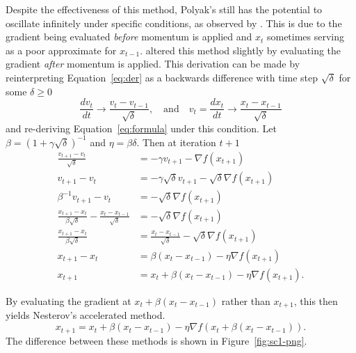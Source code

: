 \documentclass{article}
\newcommand{\dv}[2]{\frac{d #1}{d #2}}
\theoremstyle{definition}
\begin{document}
Despite the effectiveness of this method, Polyak's still has the potential to
oscillate infinitely under specific conditions, as observed by
\citeauthor{lessard2016analysis}. This is due to the gradient being evaluated
\emph{before} momentum is applied and $x_t$ sometimes serving as a poor approximate
for $x_{t - 1}$. \citeauthor{nesterov1983method} altered this method slightly by
evaluating the gradient \emph{after} momentum is applied.  This derivation can
be made by reinterpreting Equation~\ref{eq:der} as a backwards difference with time
step $\sqrt\delta$ for some $\delta \geq 0$
\begin{equation}
    \label{eq:der}
    \dv{v_t}{t} \rightarrow \frac{v_{t} - v_{t - 1}}{\sqrt{\delta}}, \quad \text{and}
    \quad v_{t} = \dv{x_t}{t} \rightarrow \frac{x_{t} - x_{t - 1}}{\sqrt{\delta}}
\end{equation}
and re-deriving Equation~\ref{eq:formula} under this condition. Let $\beta =
{\left( 1 + \gamma \sqrt{\delta} \right) }^{-1}$ and $\eta = \beta \delta$. Then
at iteration $t + 1$
\begin{equation}
    \label{eq:formula}
    \begin{aligned}
        \frac{v_{t + 1} - v_{t}}{\sqrt{\delta}} &= -\gamma v_{t + 1} -\nabla
        f(x_{t + 1}) \\
        v_{t + 1} - v_{t} &= -\gamma \sqrt{\delta}v_{t + 1} -\sqrt{\delta}\nabla
        f(x_{t + 1}) \\
        \beta^{-1}v_{t + 1} - v_{t} &= -\sqrt{\delta}\nabla
        f(x_{t + 1}) \\
        \frac{x_{t + 1} - x_{t}}{\beta\sqrt{\delta}} - \frac{x_{t} - x_{t - 1}}{\sqrt{\delta}} &=  -\sqrt{\delta}\nabla
        f(x_{t + 1}) \\
        \frac{x_{t + 1} - x_{t}}{\beta\sqrt{\delta}} &= \frac{x_{t} - x_{t -
        1}}{\sqrt{\delta}} - \sqrt{\delta}\nabla f(x_{t + 1}) \\
        x_{t + 1} - x_{t} &= \beta (x_{t} - x_{t -
        1}) - \eta \nabla f(x_{t + 1}) \\
        x_{t + 1} &= x_{t} + \beta (x_{t} - x_{t -
        1}) - \eta \nabla f(x_{t + 1}).
    \end{aligned}
\end{equation}

By evaluating the gradient at $x_t + \beta(x_t - x_{t - 1})$ rather than $x_{t +
1}$, this then yields Nesterov's accelerated method.
\begin{equation}
    x_{t + 1} = x_t + \beta (x_t - x_{t - 1}) - \eta \nabla f(x_t + \beta (x_t - x_{t -
    1})).
\end{equation}
The difference between these methods is shown in
Figure~\ref{fig:sc1-png}.
\end{document}
